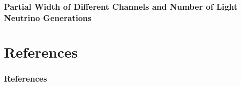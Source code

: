 \documentclass[10pt]{beamer}
\begin{document}
\begin{frame}
\frametitle{Partial Width of Different Channels and Number of Light Neutrino Generations}
\end{frame}

\section*{References}
\begin{frame}
\frametitle{References}
\printbibliography
\end{frame}
\end{document}
